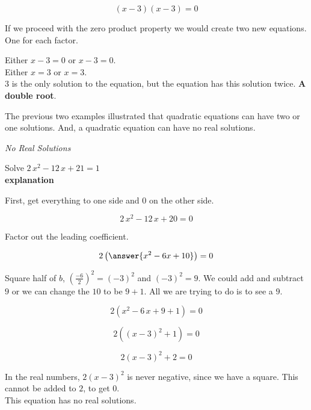 \documentclass{ximera}
\begin{document}
\[  (x - 3) (x - 3) = 0  \]


If we proceed with the zero product property we would create two new equations.  One for each factor.

Either $x - 3 = 0$   or $x - 3 = 0$. \\

Either $x = 3$ or $x = 3$.  \\

$3$ is the only solution to the equation, but the equation has this solution twice. \textbf{\textcolor{red!80!black}{A double root}}.


The previous two examples illustrated that quadratic equations can have two or one solutions.  And, a quadratic equation can have no real solutions.










\begin{example} \textit{No Real Solutions}

Solve $2 \, x^2 - 12 \, x + 21 = 1$ \\


\textbf{\textcolor{red!75!green}{explanation}} 


First, get everything to one side and $0$ on the other side.



\[  2 \, x^2 - 12 \, x + 20 = 0  \]

Factor out the leading coefficient.

\[  2 \left( \answer{x^2 - 6x + 10} \right) = 0  \]


Square half of $b$, $\left(\frac{-6}{2}\right)^2 = (-3)^2$ and $(-3)^2 = 9$.  We could add and subtract $9$ or we can change the $10$ to be $9+1$.  All we are trying to do is to see a $9$.



\[  2 (x^2 - 6 \, x + 9 + 1) = 0  \]


\[  2 ((x-3)^2 + 1) = 0  \]


\[  2 (x-3)^2 + 2 = 0  \]

In the real numbers, $2 (x-3)^2$ is never negative, since we have a square.  This cannot be added to $2$, to get $0$.  \\


This equation has no real solutions.



\end{example}
\end{document}
